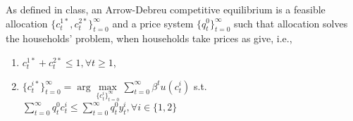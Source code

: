 \documentclass[]{article}
\begin{document}
\subsubsection{}
As defined in class, an Arrow-Debreu competitive equilibrium is a feasible allocation $\{c_t^{1*}, c_t^{2*}\}_{t = 0}^{\infty}$ and a price system $\{q_t^0\}_{t = 0}^{\infty}$ such that allocation solves the households' problem, when households take prices as give, i.e.,
\begin{enumerate}[label = \roman*)]
	\item $c_t^{1*} + c_t^{2*} \leq 1, \forall t\geq1$,
	\item $\{c_t^{i*}\}_{t = 0}^\infty = \arg\max\limits_{\{c_t^i\}_{t = 0}^\infty}\sum\limits_{t = 0}^{\infty}\beta^tu(c_t^i)$ s.t. $\sum\limits_{t = 0}^{\infty}q_t^0c_t^i\leq\sum\limits_{t = 0}^{\infty}q_t^0y_t^i, \forall i\in\{1, 2\}$
\end{enumerate}
\end{document}
